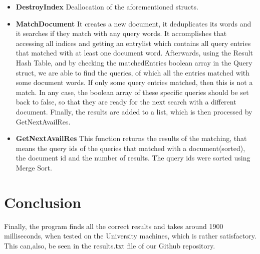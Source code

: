 \documentclass{article}
\begin{document}
\begin{itemize}
\begin{itemize}
  \item \textbf{DestroyIndex}
  Deallocation of the aforementioned structs.
  \item \textbf{MatchDocument}
  It creates a new document, it deduplicates its words and it searches if they match with any query words. It accomplishes that accessing all indices and getting an entrylist which contains all query entries that matched with at least one document word. Afterwards, using the Result Hash Table, and by checking the matchedEntries boolean array in the Query struct, we are able to find the queries, of which all the entries matched with some document words. If only some query entries matched, then this is not a match. In any case, the boolean array of these specific queries should be set back to false, so that they are ready for the next search with a different document. Finally, the results are added to a list, which is then processed by GetNextAvailRes.
  \clearpage
  \item \textbf{GetNextAvailRes}
  This function returns the results of the matching, that means the query ids of the queries that matched with a document(sorted), the document id and the number of results. The query ids were sorted using Merge Sort.
  \end{itemize}
\end{itemize}
\section{Conclusion}
Finally, the program finds all the correct results and takes around 1900 milliseconds, when tested on the University machines, which is rather satisfactory. This can,also, be seen in the results.txt file of our Github repository.
\end{document}
